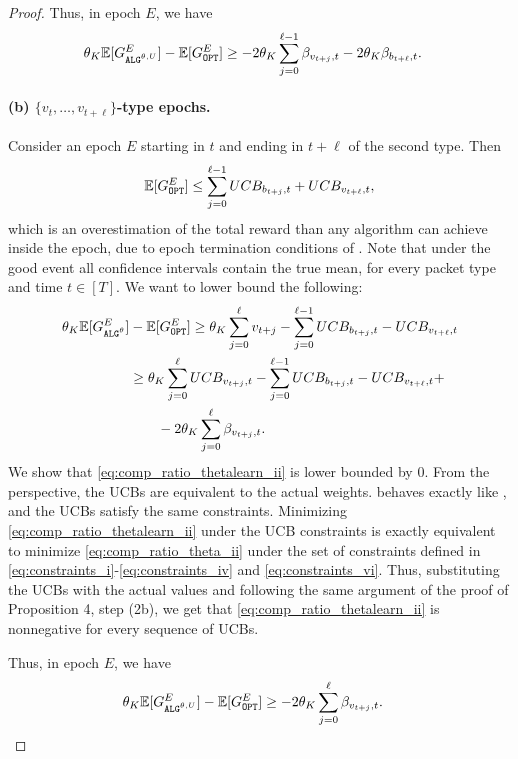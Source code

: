 \begin{proof}
    Thus, in epoch $E$, we have
    \begin{align}
        \theta_K\mathbb{E}[\Galgthetalearn
        ^E]&-\mathbb{E}[\Gopt^E] \ge - 2\theta_K \sum_{j=0}^{\ell-1}\beta_{v_{t+j},t} - 2\theta_K\beta_{b_{t+\ell},t}.\label{eq:comp_ratio_thetalearn_i_betas}
    \end{align}

    \paragraph{(b) $\{v_t, \ldots, v_{t+\ell}\}$-type epochs.} Consider an epoch $E$ starting in $t$ and ending in $t+\ell$ of the second type. Then
    \begin{align*}
        \mathbb{E}[\Gopt^E] \le \sum_{j=0}^{\ell-1} UCB_{b_{t+j},t} + UCB_{v_{t+\ell},t},
    \end{align*}
    which is an overestimation of the total reward than any algorithm can achieve inside the epoch, due to epoch termination conditions of \algthetalearn. Note that under the good event all confidence intervals contain the true mean, for every packet type and time $t\in [T]$. We want to lower bound the following:
    \begin{align}
        \theta_K\mathbb{E}[\Galgtheta^E]&-\mathbb{E}[\Gopt^E] \ge \theta_K\sum_{j=0}^{\ell}v_{t+j} - \sum_{j=0}^{\ell-1} UCB_{b_{t+j},t} - UCB_{v_{t+\ell},t} \notag \\
        &\ge \theta_K\sum_{j=0}^{\ell}UCB_{v_{t+j},t} - \sum_{j=0}^{\ell-1} UCB_{b_{t+j},t} - UCB_{v_{t+\ell},t}+ \label{eq:comp_ratio_thetalearn_ii}\\
        &\qquad- 2\theta_K \sum_{j=0}^{\ell}\beta_{v_{t+j},t}.\notag
    \end{align}
    We show that \eqref{eq:comp_ratio_thetalearn_ii} is lower bounded by $0$. From the \algthetalearn perspective, the UCBs are equivalent to the actual weights. \algthetalearn behaves exactly like \algtheta, and the UCBs satisfy the same constraints. Minimizing \eqref{eq:comp_ratio_thetalearn_ii} under the UCB constraints is exactly equivalent to minimize \eqref{eq:comp_ratio_theta_ii} under the set of constraints defined in \eqref{eq:constraints_i}-\eqref{eq:constraints_iv} and \eqref{eq:constraints_vi}. Thus, substituting the UCBs with the actual values and following the same argument of the proof of Proposition 4, step (2b), we get that \eqref{eq:comp_ratio_thetalearn_ii} is nonnegative for every sequence of UCBs. 

    Thus, in epoch $E$, we have
    \begin{align}
        \theta_K\mathbb{E}[\Galgthetalearn^E]&-\mathbb{E}[\Gopt^E] \ge - 2\theta_K \sum_{j=0}^{\ell}\beta_{v_{t+j},t}.\label{eq:comp_ratio_thetalearn_ii_betas}
    \end{align}

\end{proof}
